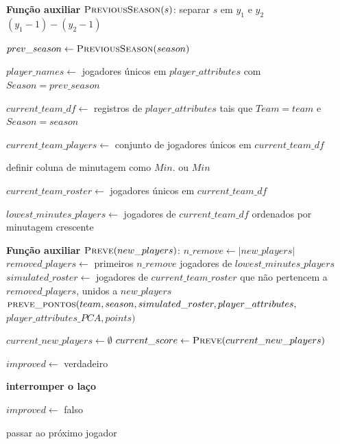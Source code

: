 \begin{breakablealgorithm}
\label{alg:guloso_first}
\begin{algorithmic}[1]


\Statex \textbf{Função auxiliar} $\textsc{PreviousSeason}(s)$:
\State separar $s$ em $y_1$ e $y_2$
\State \Return $(y_1 - 1)-(y_2 - 1)$

\State $prev\_season \gets \textsc{PreviousSeason}(season)$

\State $player\_names \gets$ jogadores únicos em $player\_attributes$ com $Season = prev\_season$

\State $current\_team\_df \gets$ registros de $player\_attributes$ tais que $Team = team$ e $Season = season$

\State $current\_team\_players \gets$ conjunto de jogadores únicos em $current\_team\_df$

\State definir coluna de minutagem como $Min.$ ou $Min$

\State $current\_team\_roster \gets$ jogadores únicos em $current\_team\_df$

\State $lowest\_minutes\_players \gets$ jogadores de $current\_team\_df$ ordenados por minutagem crescente

\Statex \textbf{Função auxiliar} $\textsc{Preve}(new\_players)$:
\State $n\_remove \gets |new\_players|$
\State $removed\_players \gets$ primeiros $n\_remove$ jogadores de $lowest\_minutes\_players$
\State $simulated\_roster \gets$ jogadores de $current\_team\_roster$ que não pertencem a $removed\_players$, unidos a $new\_players$
\State \Return $\textsc{preve\_pontos}(team, season, simulated\_roster, player\_attributes,$
\Statex \hspace{\algorithmicindent} $player\_attributes\_PCA, points)$

\State $current\_new\_players \gets \emptyset$
\State $current\_score \gets \textsc{Preve}(current\_new\_players)$

\State $improved \gets$ verdadeiro

        \State \textbf{interromper o laço}
    \EndIf

    \State $improved \gets$ falso


            \State passar ao próximo jogador
        \EndIf


\end{algorithmic}
\end{breakablealgorithm}
